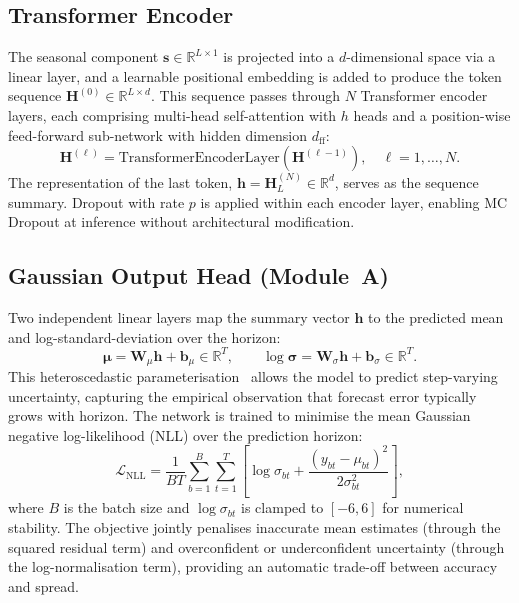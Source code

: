 \documentclass[runningheads]{llncs}
\begin{document}
\subsection{Transformer Encoder}

The seasonal component $\mathbf{s} \in \mathbb{R}^{L \times 1}$ is projected into a
$d$-dimensional space via a linear layer, and a learnable positional embedding is
added to produce the token sequence $\mathbf{H}^{(0)} \in \mathbb{R}^{L \times d}$.
This sequence passes through $N$ Transformer encoder layers, each comprising
multi-head self-attention with $h$ heads and a position-wise feed-forward sub-network
with hidden dimension $d_\mathrm{ff}$:
\begin{equation}
  \mathbf{H}^{(\ell)} =
  \mathrm{TransformerEncoderLayer}\!\left(\mathbf{H}^{(\ell-1)}\right),
  \quad \ell = 1, \ldots, N.
\end{equation}
The representation of the last token,
$\mathbf{h} = \mathbf{H}^{(N)}_{L} \in \mathbb{R}^{d}$,
serves as the sequence summary.
Dropout with rate $p$ is applied within each encoder layer, enabling MC Dropout
at inference without architectural modification.

\subsection{Gaussian Output Head (Module~A)}

Two independent linear layers map the summary vector $\mathbf{h}$ to the predicted
mean and log-standard-deviation over the horizon:
\begin{equation}
  \boldsymbol{\mu} = \mathbf{W}_\mu \mathbf{h} + \mathbf{b}_\mu \in \mathbb{R}^T,
  \qquad
  \log\boldsymbol{\sigma} = \mathbf{W}_\sigma \mathbf{h} + \mathbf{b}_\sigma \in \mathbb{R}^T.
\end{equation}
This heteroscedastic parameterisation~\cite{nix1994} allows the model to predict
step-varying uncertainty, capturing the empirical observation that forecast error
typically grows with horizon.
The network is trained to minimise the mean Gaussian negative log-likelihood (NLL)
over the prediction horizon:
\begin{equation}
  \mathcal{L}_\mathrm{NLL} = \frac{1}{BT} \sum_{b=1}^{B}\sum_{t=1}^{T}
  \left[
    \log\sigma_{bt} + \frac{(y_{bt} - \mu_{bt})^2}{2\sigma_{bt}^2}
  \right],
  \label{eq:nll}
\end{equation}
where $B$ is the batch size and $\log\sigma_{bt}$ is clamped to $[-6, 6]$ for
numerical stability.
The objective jointly penalises inaccurate mean estimates (through the squared
residual term) and overconfident or underconfident uncertainty (through the
log-normalisation term), providing an automatic trade-off between accuracy and spread.
\end{document}
